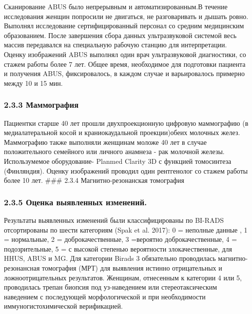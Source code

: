 \documentclass[
]{article}
\begin{document}
Сканирование ABUS было непрерывным и автоматизированным.В течение
исследования женщин попросили не двигаться, не разговаривать и дышать
ровно. Выполнял исследование сертифицированный персонал со средним
медицинским образованием. После завершения сбора данных ультразвуковой
системой весь массив передавался на специальную рабочую станцию для
интерпретации. Оценку изображений ABUS выполнял один врач ультразвуковой
диагностики, со стажем работы более 7 лет. Общее время, необходимое для
подготовки пациента и получения ABUS, фиксировалось, в каждом случае и
варьировалось примерно между 10 и 15 мин.

\hypertarget{ux43cux430ux43cux43cux43eux433ux440ux430ux444ux438ux44f}{%
\subsubsection{2.3.3
Маммография}\label{ux43cux430ux43cux43cux43eux433ux440ux430ux444ux438ux44f}}

Пациентки старше 40 лет прошли двухпроекционную цифровую маммографию (в
медиалатеральной косой и краниокаудальной проекции)обеих молочных желез.
Маммографию также выполняли женщинам моложе 40 лет в случае
положительного семейного или личного анамнеза - рак молочной железы.
Использумемое оборудование- Planmed Clarity 3D с функцией томосинтеза
(Финляндия). Оценку изображений проводил один рентгенолог со стажем
работы более 10 лет. \#\#\# 2.3.4 Магнитно-резонанская томография

\hypertarget{ux43eux446ux435ux43dux43aux430-ux432ux44bux44fux432ux43bux435ux43dux43dux44bux445-ux438ux437ux43cux435ux43dux435ux43dux438ux439.}{%
\subsubsection{2.3.5 Оценка выявленных
изменений.}\label{ux43eux446ux435ux43dux43aux430-ux432ux44bux44fux432ux43bux435ux43dux43dux44bux445-ux438ux437ux43cux435ux43dux435ux43dux438ux439.}}

Результаты выявленных изменений были классифицированы по BI-RADS
отсортированы по шести категориям (Spak et al. 2017): 0 = неполные
данные , 1 = нормальные, 2 = доброкачественные, 3 =вероятно
доброкачественные, 4 = подозрительные, 5 = с высокой степенью
вероятности злокачественные, для HHUS, ABUS и MG. Для категории Birads 3
обязательно проводилась магнитно-резонансная томография (МРТ) для
выявления истинно отрицательных и ложноотрицательных результатов.
Женщинам, отнесенным к категории 4 или 5, проводилась трепан биопсия под
уз-наведением или стереотаксическим наведением с последующей
морфологической и при необходимости иммуногистохимической верификацией.
\end{document}
